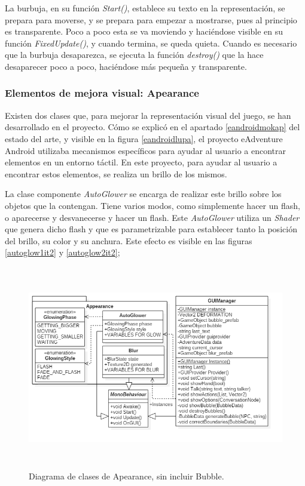 La burbuja, en su función \textit{Start()}, establece su texto en la representación, se prepara para moverse, y se prepara para empezar a mostrarse, pues al principio es transparente. Poco a poco esta se va moviendo y haciéndose visible en su función \textit{FixedUpdate()}, y cuando termina, se queda quieta. Cuando es necesario que la burbuja desaparezca, se ejecuta la función \textit{destroy()} que la hace desaparecer poco a poco, haciéndose más pequeña y transparente.

\subsubsection{Elementos de mejora visual: Apearance}

Existen dos clases que, para mejorar la representación visual del juego, se han desarrollado en el proyecto. Cómo se explicó en el apartado \ref{eandroidmokap} del estado del arte, y visible en la figura \ref{eandroidlupa}, el proyecto eAdventure Android utilizaba mecanismos específicos para ayudar al usuario a encontrar elementos en un entorno táctil. En este proyecto, para ayudar al usuario a encontrar estos elementos, se realiza un brillo de los mismos.

La clase componente \textit{AutoGlower} se encarga de realizar este brillo sobre los objetos que la contengan. Tiene varios modos, como simplemente hacer un flash, o aparecerse y desvanecerse y hacer un flash. Este \textit{AutoGlower} utiliza un \textit{Shader} que genera dicho flash y que es parametrizable para establecer tanto la posición del brillo, su color y su anchura. Este efecto es visible en las figuras \ref{autoglow1it2} y \ref{autoglow2it2};

\begin{figure}[h!]
	\centerline{\includegraphics[height=3.5in]{figures/it2/Apearance.png}}
	\caption[Apearance - Versión Final]{Diagrama de clases de Apearance, sin incluir Bubble.}
	\label{apearanceit2}
\end{figure}

